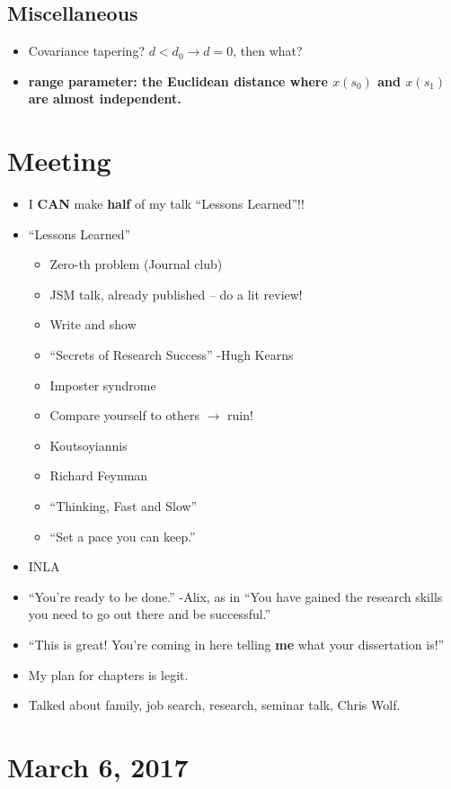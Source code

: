 \documentclass{article}
\begin{document}
\subsection*{Miscellaneous}
\begin{itemize}
\item Covariance tapering? $d < d_{0} \rightarrow d = 0$, then what?
\item {\bf range parameter: the Euclidean distance where $x(s_{0})$ and $x(s_{1})$ are almost independent.} \citep{Lindgren2011}
\end{itemize}

\section*{Meeting}
\begin{itemize}
\item I {\bf CAN} make {\bf half} of my talk ``Lessons Learned''!!
\item ``Lessons Learned''
  \begin{itemize}
  \item Zero-th problem (Journal club)
  \item JSM talk, already published -- do a lit review!
  \item Write and show
  \item ``Secrets of Research Success'' -Hugh Kearns
  \item Imposter syndrome
  \item Compare yourself to others $\rightarrow$ ruin!
  \item Koutsoyiannis
  \item Richard Feynman
  \item ``Thinking, Fast and Slow''
  \item ``Set a pace you can keep.''
  \end{itemize}
\item INLA
\item ``You're ready to be done.'' -Alix, as in ``You have gained the research skills you need to go out there and be successful.''
\item ``This is great! You're coming in here telling {\bf  me} what your dissertation is!''
\item My plan for chapters is legit.
\item Talked about family, job search, research, seminar talk, Chris Wolf.
\end{itemize}

\section*{March 6, 2017}
\end{document}
